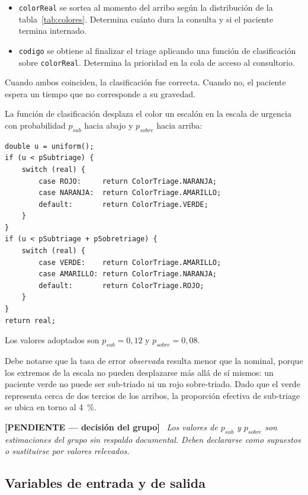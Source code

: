 \documentclass{article}
\newenvironment{pendiente}
  {\par\medskip\noindent\begingroup\color{red!65!black}%
   \textbf{[PENDIENTE — decisión del grupo]}\ \itshape}
  {\endgroup\par\medskip}
\begin{document}
\begin{itemize}
  \item \texttt{colorReal} se sortea al momento del arribo según la
  distribución de la tabla~\ref{tab:colores}. Determina cuánto dura la
  consulta y si el paciente termina internado.
  \item \texttt{codigo} se obtiene al finalizar el triage aplicando una
  función de clasificación sobre \texttt{colorReal}. Determina la prioridad
  en la cola de acceso al consultorio.
\end{itemize}

Cuando ambos coinciden, la clasificación fue correcta. Cuando no, el paciente
espera un tiempo que no corresponde a su gravedad.

La función de clasificación desplaza el color un escalón en la escala de
urgencia con probabilidad $p_{sub}$ hacia abajo y $p_{sobre}$ hacia arriba:

\begin{lstlisting}
double u = uniform();
if (u < pSubtriage) {
    switch (real) {
        case ROJO:     return ColorTriage.NARANJA;
        case NARANJA:  return ColorTriage.AMARILLO;
        default:       return ColorTriage.VERDE;
    }
}
if (u < pSubtriage + pSobretriage) {
    switch (real) {
        case VERDE:    return ColorTriage.AMARILLO;
        case AMARILLO: return ColorTriage.NARANJA;
        default:       return ColorTriage.ROJO;
    }
}
return real;
\end{lstlisting}

Los valores adoptados son $p_{sub} = 0{,}12$ y $p_{sobre} = 0{,}08$.

Debe notarse que la tasa de error \emph{observada} resulta menor que la
nominal, porque los extremos de la escala no pueden desplazarse más allá de
sí mismos: un paciente verde no puede ser sub-triado ni un rojo
sobre-triado. Dado que el verde representa cerca de dos tercios de los
arribos, la proporción efectiva de sub-triage se ubica en torno al 4~\%.

\begin{pendiente}
Los valores de $p_{sub}$ y $p_{sobre}$ son estimaciones del grupo sin
respaldo documental. Deben declararse como supuestos o sustituirse por
valores relevados.
\end{pendiente}

\subsection{Variables de entrada y de salida}
\end{document}

